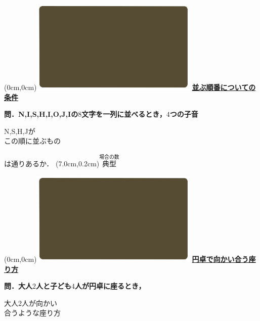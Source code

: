 \documentclass[10pt,
fleqn,
dvipdfmx,
uplatex
]{jsarticle}
\begin{document}
\at(0cm,0cm){\includegraphics[width=8cm,bb=0 0 1920 1080]{./youtube/thumbnails/templates/smart_background/場合の数.jpeg}}
{\color{orange}\bf\boldmath\LARGE\underline{並ぶ順番についての条件}}\vspace{0.3zw}

\normalsize 
\bf\boldmath 問．N,\;I,\;S,\;H,\;I,\;O,\;J,\;Iの$8$文字を一列に並べるとき，$4$つの子音

\huge
\vspace{-0.2zw}
\hspace{0.1zw} N,\;S,\;H,\;Jが\vspace{-0.2zw}\\
\hfill この順に並ぶもの\hspace{0.1zw} 

\normalsize
\hfill は通りあるか．
\at(7.0cm,0.2cm){\small\color{bradorange}$\overset{\text{場合の数}}{\text{典型}}$}

\newpage

\at(0cm,0cm){\includegraphics[width=8cm,bb=0 0 1920 1080]{./youtube/thumbnails/templates/smart_background/場合の数.jpeg}}
{\color{orange}\bf\boldmath\LARGE\underline{円卓で向かい合う座り方}}\vspace{0.3zw}

\normalsize 
\bf\boldmath 問．大人$2$人と子ども$4$人が円卓に座るとき，

\Huge
\vspace{-0.2zw}
\hspace{0.05zw} 大人$2$人が向かい\vspace{-0.2zw}\\
\hfill 合うような座り方\hspace{0.1zw} 
\vspace{0.1zw}
\end{document}
